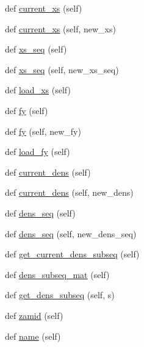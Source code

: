 \begin{DoxyCompactItemize}
def \hyperlink{classonix_1_1passport_1_1Passport_ab7350ba0c953a0d2c8482abe3943993e}{current\+\_\+xs} (self)
\item 
def \hyperlink{classonix_1_1passport_1_1Passport_aa44c60d6e0535a89733418cb5ca476b9}{current\+\_\+xs} (self, new\+\_\+xs)
\item 
def \hyperlink{classonix_1_1passport_1_1Passport_a9cf8684ae2a1c0756b19a3bc13c679d1}{xs\+\_\+seq} (self)
\item 
def \hyperlink{classonix_1_1passport_1_1Passport_a14234e2569402104268dcfd9b0db6f20}{xs\+\_\+seq} (self, new\+\_\+xs\+\_\+seq)
\item 
def \hyperlink{classonix_1_1passport_1_1Passport_a9c5b2cd3e81e98ec9c52c6429b049b68}{load\+\_\+xs} (self)
\item 
def \hyperlink{classonix_1_1passport_1_1Passport_a8c1aec4f4e3c394b41bc9a2dc683b38e}{fy} (self)
\item 
def \hyperlink{classonix_1_1passport_1_1Passport_a3b5293faf78c91bf22954edd3e459499}{fy} (self, new\+\_\+fy)
\item 
def \hyperlink{classonix_1_1passport_1_1Passport_a8cbf0209b52de3af8ff6ca406d4307da}{load\+\_\+fy} (self)
\item 
def \hyperlink{classonix_1_1passport_1_1Passport_a3037da11a2c0ffa2767041d81e7441d0}{current\+\_\+dens} (self)
\item 
def \hyperlink{classonix_1_1passport_1_1Passport_a40845de819111810c0a3aa428a93206e}{current\+\_\+dens} (self, new\+\_\+dens)
\item 
def \hyperlink{classonix_1_1passport_1_1Passport_ab3fb63fcada645c44aad3f0b1c2718b0}{dens\+\_\+seq} (self)
\item 
def \hyperlink{classonix_1_1passport_1_1Passport_a09304f9d31d64322601f8dd5a8da8033}{dens\+\_\+seq} (self, new\+\_\+dens\+\_\+seq)
\item 
def \hyperlink{classonix_1_1passport_1_1Passport_a10f90a32e5c4f90e59c82fcc0c757af6}{get\+\_\+current\+\_\+dens\+\_\+subseq} (self)
\item 
def \hyperlink{classonix_1_1passport_1_1Passport_a44c355e9c91a9847add14cec69ef0a52}{dens\+\_\+subseq\+\_\+mat} (self)
\item 
def \hyperlink{classonix_1_1passport_1_1Passport_afc8cf13faa2b745994dc7b93fff4d990}{get\+\_\+dens\+\_\+subseq} (self, s)
\item 
def \hyperlink{classonix_1_1passport_1_1Passport_a5ec6485dc7b69d0373b798bbf2b7ba47}{zamid} (self)
\item 
def \hyperlink{classonix_1_1passport_1_1Passport_a4adab1f18d92d2c23f2b302a13318fcc}{name} (self)

\end{DoxyCompactItemize}
